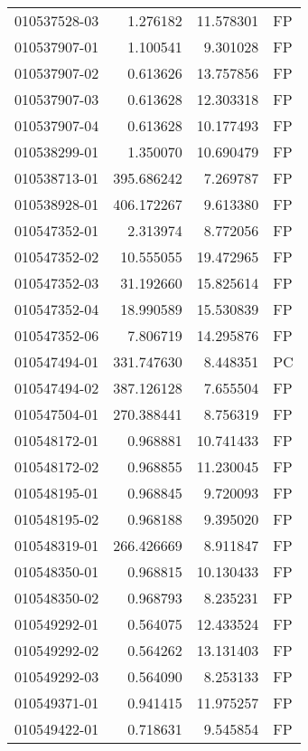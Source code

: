 \begin{tabular}{lrrl}
010537528-03 &    1.276182 &      11.578301 &   FP \\
010537907-01 &    1.100541 &       9.301028 &   FP \\
010537907-02 &    0.613626 &      13.757856 &   FP \\
010537907-03 &    0.613628 &      12.303318 &   FP \\
010537907-04 &    0.613628 &      10.177493 &   FP \\
010538299-01 &    1.350070 &      10.690479 &   FP \\
010538713-01 &  395.686242 &       7.269787 &   FP \\
010538928-01 &  406.172267 &       9.613380 &   FP \\
010547352-01 &    2.313974 &       8.772056 &   FP \\
010547352-02 &   10.555055 &      19.472965 &   FP \\
010547352-03 &   31.192660 &      15.825614 &   FP \\
010547352-04 &   18.990589 &      15.530839 &   FP \\
010547352-06 &    7.806719 &      14.295876 &   FP \\
010547494-01 &  331.747630 &       8.448351 &   PC \\
010547494-02 &  387.126128 &       7.655504 &   FP \\
010547504-01 &  270.388441 &       8.756319 &   FP \\
010548172-01 &    0.968881 &      10.741433 &   FP \\
010548172-02 &    0.968855 &      11.230045 &   FP \\
010548195-01 &    0.968845 &       9.720093 &   FP \\
010548195-02 &    0.968188 &       9.395020 &   FP \\
010548319-01 &  266.426669 &       8.911847 &   FP \\
010548350-01 &    0.968815 &      10.130433 &   FP \\
010548350-02 &    0.968793 &       8.235231 &   FP \\
010549292-01 &    0.564075 &      12.433524 &   FP \\
010549292-02 &    0.564262 &      13.131403 &   FP \\
010549292-03 &    0.564090 &       8.253133 &   FP \\
010549371-01 &    0.941415 &      11.975257 &   FP \\
010549422-01 &    0.718631 &       9.545854 &   FP \\

\end{tabular}
